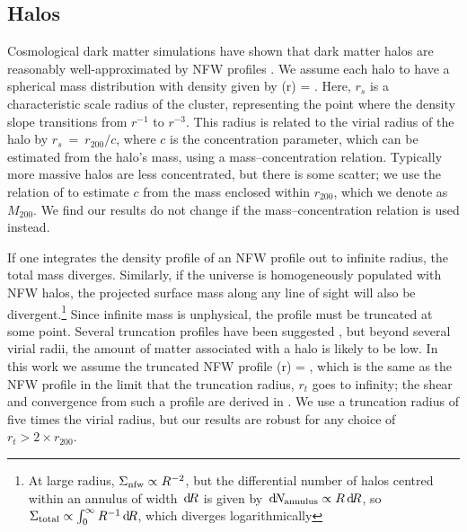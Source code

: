 \documentclass[useAMS,usenatbib,a4paper]{mn2e}
\begin{document}

\subsection{Halos}
\label{sec:model:halos}

Cosmological dark matter simulations have shown that dark matter
halos are reasonably well-approximated by NFW profiles 
\citep{NFW}. We assume each halo to have a spherical mass distribution with 
density given by
\be\label{eq:rhonfw}
\rho(r) = 
.
\ee
Here, $r_{s}$ is a characteristic scale 
radius of the cluster, representing the point where
the density slope transitions from $r^{-1}$ to $r^{-3}$. This radius is
related to the virial radius of the halo by $r_{s}~=~r_{200}/c$, where $c$ is
the concentration parameter, which can be estimated from the halo's mass,
using a mass--concentration relation. Typically more massive halos are less
concentrated, but there is some scatter; we use the relation of
\citet{Neto2007} to estimate $c$ from the mass enclosed within $r_{200}$,
which we denote as $M_{200}$. We find our results do not change if the
\citet{MaccioEtal2008} mass--concentration relation is used instead. 

If one integrates the density profile of an NFW profile out to infinite
radius, the total mass diverges. Similarly, if the universe is
homogeneously populated with NFW halos, the projected surface mass along
any line of sight will also be divergent.\footnote{At large radius,
$\Sigma_{\rm nfw} \propto R^{-2}$, but the differential number of halos
centred within an annulus of width $\, \mathrm{d} \! R$ is given by $\, \mathrm{d} \! N_{\rm
annulus} \propto R \, \mathrm{d} \! R$, so  $\Sigma_{\rm total} \propto
\int_{0}^{\infty} R^{-1} \, \mathrm{d} \! R$, which diverges logarithmically} Since
infinite mass is unphysical, the profile must be truncated at some
point. Several truncation profiles have been suggested
\citep[e.g][]{BMO}, but beyond several virial radii, the amount of
matter associated with a halo is likely to be low. In this work we
assume the truncated NFW profile
\be\label{eq:bmoprofile}
\rho(r) = 
,
\ee
which is the same as the NFW profile in the limit that the truncation
radius, $r_t$ goes to infinity; the shear and convergence from such a
profile are derived in \citet{BMO}.
 We use a truncation radius of five times
the virial radius, but our results are robust for any choice of $r_t>2
\times r_{200}$. 
\end{document}
